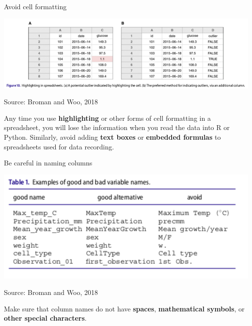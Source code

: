 \documentclass[ignorenonframetext,]{beamer}
\begin{document}
\begin{frame}{Avoid cell formatting}
\protect\hypertarget{avoid-cell-formatting}{}

\begin{center}\includegraphics[width=\textwidth]{figures/cell_formatting} \end{center}

\vspace{-0.4cm}

\scriptsize Source: Broman and Woo, 2018

\medskip

\normalsize Any time you use \textbf{highlighting} or other forms of
cell formatting in a spreadsheet, you will lose the information when you
read the data into R or Python. Similarly, avoid adding
\textbf{text boxes} or \textbf{embedded formulas} to spreadsheets used
for data recording.

\end{frame}

\begin{frame}{Be careful in naming columns}
\protect\hypertarget{be-careful-in-naming-columns}{}

\begin{center}\includegraphics[width=\textwidth]{figures/column_names} \end{center}

\vspace{-0.4cm}

\scriptsize Source: Broman and Woo, 2018

\medskip

\normalsize Make sure that column names do not have \textbf{spaces},
\textbf{mathematical symbols}, or \textbf{other special characters}.

\end{frame}
\end{document}
